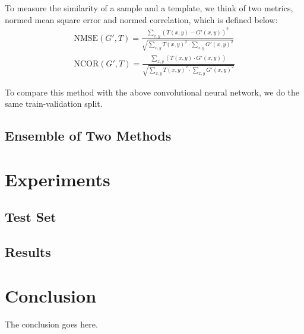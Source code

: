 \documentclass[journal]{IEEEtran}
\begin{document}
To measure the similarity of a sample and a template, we think of two metrics, normed mean square error and normed correlation, which is defined below:
\begin{align*}
	\text{NMSE}(G',T)= \frac{\sum_{x,y} (T(x,y)-G'(x,y))^2}{\sqrt{\sum_{x,y}T(x,y)^2 \cdot \sum_{x,y} G'(x,y)^2}}\\
	\text{NCOR}(G',T)= \frac{\sum_{x,y} (T(x,y) \cdot G'(x,y))}{\sqrt{\sum_{x,y}T(x,y)^2 \cdot \sum_{x,y} G'(x,y)^2}}
\end{align*}

To compare this method with the above convolutional neural network, we do the same train-validation split.

\subsection{Ensemble of Two Methods}

\section{Experiments}
\subsection{Test Set}
\subsection{Results}

\section{Conclusion}
The conclusion goes here.





\end{document}
